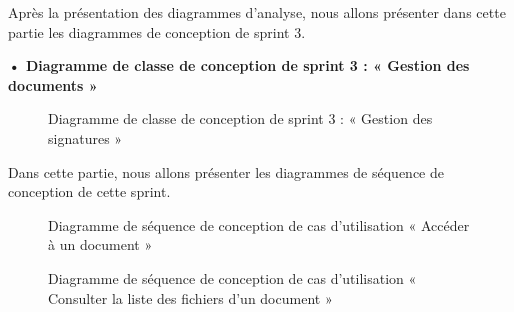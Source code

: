 Après la présentation des diagrammes d'analyse, nous allons présenter dans cette partie les diagrammes de conception de sprint 3.
\newpage 
\begin{landscape}

\textbf{•	Diagramme de classe de conception de sprint 3 : « Gestion des documents »}

\begin{figure}[H]
  \centering
  \caption{Diagramme de classe de conception de sprint 3 : « Gestion des signatures »}
  \label{fig:class_diagram_signatures3}
\end{figure}
\end{landscape}
\newpage
Dans cette partie, nous allons présenter les diagrammes de séquence de conception de cette sprint.\\
\begin{figure}[H]
  \centering
  \caption{Diagramme de séquence de conception de cas d'utilisation « Accéder à un document »}
  \label{fig:sequence_conception_preview_document}
\end{figure}
\begin{figure}[H]
  \centering
  \caption{Diagramme de séquence de conception de cas d'utilisation « Consulter la liste des fichiers d'un document »}
  \label{fig:sequence_conception_previewFiles}
\end{figure}
